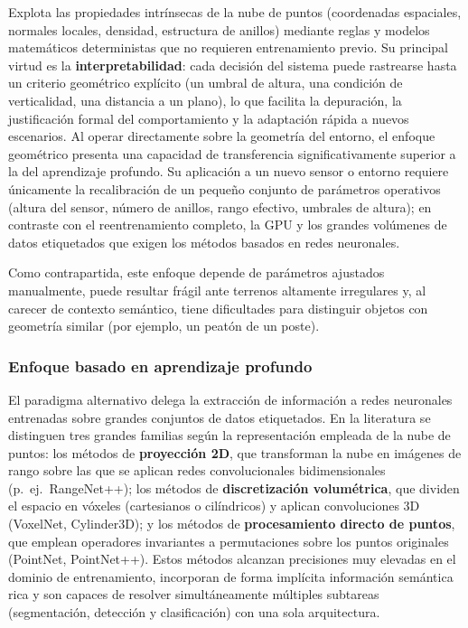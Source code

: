 Explota las propiedades intrínsecas de la nube de puntos (coordenadas
espaciales, normales locales, densidad, estructura de anillos) mediante
reglas y modelos matemáticos deterministas que no requieren
entrenamiento previo. Su principal virtud es la \textbf{interpretabilidad}:
cada decisión del sistema puede rastrearse hasta un criterio geométrico
explícito (un umbral de altura, una condición de verticalidad, una
distancia a un plano), lo que facilita la depuración, la justificación
formal del comportamiento y la adaptación rápida a nuevos escenarios.
Al operar directamente sobre la geometría del entorno, el enfoque
geométrico presenta una capacidad de transferencia significativamente
superior a la del aprendizaje profundo. Su aplicación a un nuevo sensor
o entorno requiere únicamente la recalibración de un pequeño conjunto
de parámetros operativos (altura del sensor, número de anillos, rango
efectivo, umbrales de altura); en contraste con el reentrenamiento
completo, la GPU y los grandes volúmenes de datos etiquetados que
exigen los métodos basados en redes neuronales.

Como contrapartida, este enfoque depende de parámetros ajustados
manualmente, puede resultar frágil ante terrenos altamente irregulares
y, al carecer de contexto semántico, tiene dificultades para distinguir
objetos con geometría similar (por ejemplo, un peatón de un poste).

\subsubsection{Enfoque basado en aprendizaje profundo}
\label{sec:enfoque-dl}

El paradigma alternativo delega la extracción de información a redes
neuronales entrenadas sobre grandes conjuntos de datos etiquetados. En
la literatura se distinguen tres grandes familias según la
representación empleada de la nube de puntos: los métodos de
\textbf{proyección 2D}, que transforman la nube en imágenes de rango
sobre las que se aplican redes convolucionales bidimensionales
(p.\ ej.\ RangeNet++); los métodos de \textbf{discretización
volumétrica}, que dividen el espacio en vóxeles (cartesianos o
cilíndricos) y aplican convoluciones 3D (VoxelNet, Cylinder3D); y los
métodos de \textbf{procesamiento directo de puntos}, que emplean
operadores invariantes a permutaciones sobre los puntos originales
(PointNet, PointNet++). Estos métodos alcanzan precisiones muy elevadas
en el dominio de entrenamiento, incorporan de forma implícita
información semántica rica y son capaces de resolver simultáneamente
múltiples subtareas (segmentación, detección y clasificación) con una
sola arquitectura.

